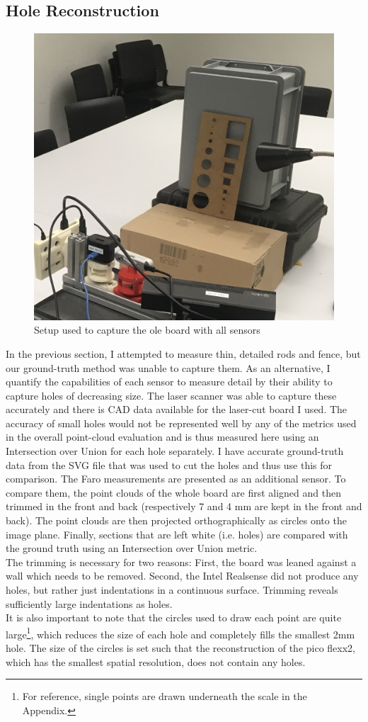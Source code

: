 \subsection{Hole Reconstruction}
\begin{figure}
    \centering
    \includegraphics[width=.5\textwidth]{resources/images/depth_estimation/hole_board/setup.jpeg}
    \caption[Image of the Hole Board]{Setup used to capture the ole board with all sensors}
    \label{fig:holeBoardSetup}
\end{figure}
In the previous section, I attempted to measure thin, detailed rods and fence, but our ground-truth method was unable to capture them. As an alternative, I quantify the capabilities of each sensor to measure detail by their ability to capture holes of decreasing size. The laser scanner was able to capture these accurately and there is CAD data available for the laser-cut board I used.
\newline
\newline
The accuracy of small holes would not be represented well by any of the metrics used in the overall point-cloud evaluation and is thus measured here using an Intersection over Union for each hole separately.
I have accurate ground-truth data from the SVG file that was used to cut the holes and thus use this for comparison. The Faro measurements are presented as an additional sensor.
To compare them, the point clouds of the whole board are first aligned and then trimmed in the front and back (respectively 7 and 4 mm are kept in the front and back).
The point clouds are then projected orthographically as circles onto the image plane. 
Finally, sections that are left white (i.e. holes) are compared with the ground truth using an Intersection over Union metric.\\
The trimming is necessary for two reasons: First, the board was leaned against a wall which needs to be removed. Second, the Intel Realsense did not produce any holes, but rather just indentations in a continuous surface. Trimming reveals sufficiently large indentations as holes.\\ It is also important to note that the circles used to draw each point are quite large\footnote{For reference, single points are drawn underneath the scale in the Appendix.}, which reduces the size of each hole and completely fills the smallest 2mm hole. The size of the circles is set such that the reconstruction of the pico flexx2, which has the smallest spatial resolution, does not contain any holes.

